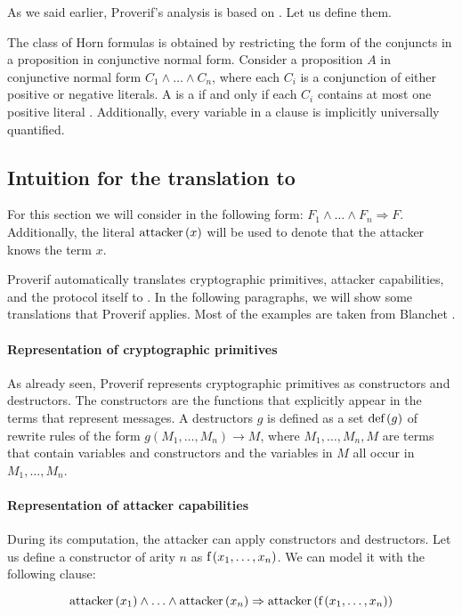 As we said earlier, Proverif's analysis is based on \Horncs{}. Let us define them.

The class of Horn formulas is obtained by restricting the form of the conjuncts in a proposition in conjunctive normal form. Consider a proposition $A$ in conjunctive normal form $C_1 \land \ldots \land C_n$, where each $C_i$ is a conjunction of either positive or negative literals. A is a \Hornc{} if and only if each $C_i$ contains at most one positive literal \cite{DOWLING1984267,horn_1951}. Additionally, every variable in a clause is implicitly universally quantified.


\subsection{Intuition for the translation to \Horncs{}}
For this section we will consider \Horncs{} in the following form: $F_1 \land \ldots \land F_n \Rightarrow F$.
Additionally, the literal $\mbox{attacker}\left(x\right)$ will be used to denote that the attacker knows the term $x$.

Proverif automatically translates cryptographic primitives, attacker capabilities, and the protocol itself to \Horncs{}. In the following paragraphs, we will show some translations that Proverif applies. Most of the examples are taken from Blanchet \cite{blanchet:hal-01110425}.

\paragraph{Representation of cryptographic primitives}
As already seen, Proverif represents cryptographic primitives as constructors and destructors. The constructors are the functions that explicitly appear in the terms that represent messages. A destructors $g$ is defined as a set $\mbox{def}\left(g\right)$ of rewrite rules of the form $g\left(M_1, \ldots, M_n\right) \rightarrow M$, where $M_1, \ldots, M_n, M$ are terms that contain variables and constructors and the variables in $M$ all occur in $M_1, \ldots, M_n$.


\paragraph{Representation of attacker capabilities}
During its computation, the attacker can apply constructors and destructors. Let us define a constructor of arity $n$ as $\mbox{f}\left(x_1, \ldots, x_n\right)$. We can model it with the following clause:

\begin{equation}
  \mbox{attacker}\left(x_1\right) \land \ldots \land \mbox{attacker}\left(x_n\right) \Rightarrow \mbox{attacker}\left(\mbox{f}\left(x_1,\ldots,x_n\right)\right)
\end{equation}

